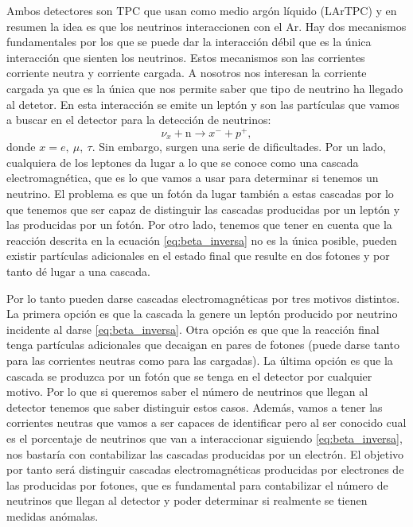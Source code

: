 \documentclass[a4paper,12pt,twoside,titlepage]{article}
\begin{document}
Ambos detectores son TPC que usan como medio argón líquido (LArTPC) y en resumen la idea es que los neutrinos interaccionen con el Ar. Hay dos mecanismos fundamentales por los que se puede dar la interacción débil que es la única interacción que sienten los neutrinos. Estos mecanismos son las corrientes corriente neutra y corriente cargada. A nosotros nos interesan la corriente cargada ya que es la única que nos permite saber que tipo de neutrino ha llegado al detetor. En esta interacción se emite un leptón y son las partículas que vamos a buscar en el detector para la detección de neutrinos:
\begin{equation}
  \label{eq:beta_inversa}
  \nu_x + \text{n} \rightarrow x^- + p^+,
\end{equation}
donde $x = e,~\mu,~\tau$. Sin embargo, surgen una serie de dificultades. Por un lado, cualquiera de los leptones da lugar a lo que se conoce como una cascada electromagnética, que es lo que vamos a usar para determinar si tenemos un neutrino. El problema es que un fotón da lugar también a estas cascadas por lo que tenemos que ser capaz de distinguir las cascadas producidas por un leptón y las producidas por un fotón. Por otro lado, tenemos que tener en cuenta que la reacción descrita en la ecuación \ref{eq:beta_inversa} no es la única posible, pueden existir partículas adicionales en el estado final que resulte en dos fotones y por tanto dé lugar a una cascada. 

Por lo tanto pueden darse cascadas electromagnéticas por tres motivos distintos. La primera opción es que la cascada la genere un leptón producido por neutrino incidente al darse \ref{eq:beta_inversa}. Otra opción es que que la reacción final tenga partículas adicionales que decaigan en pares de fotones (puede darse tanto para las corrientes neutras como para las cargadas). La última opción es que la cascada se produzca por un fotón que se tenga en el detector por cualquier motivo. Por lo que si queremos saber el número de neutrinos que llegan al detector tenemos que saber distinguir estos casos. Además, vamos a tener las corrientes neutras que vamos a ser capaces de identificar pero al ser conocido cual es el porcentaje de neutrinos que van a interaccionar siguiendo \ref{eq:beta_inversa}, nos bastaría con contabilizar las cascadas producidas por un electrón. El objetivo por tanto será distinguir cascadas electromagnéticas producidas por electrones de las producidas por fotones, que es fundamental para contabilizar el número de neutrinos que llegan al detector y poder determinar si realmente se tienen medidas anómalas.
\end{document}
